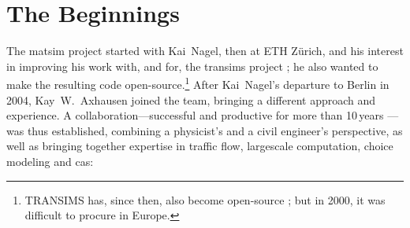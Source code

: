 \section{The Beginnings}
\label{sec:howitstarted}
The \gls{matsim} project \citep[][]{MATSIM_Webpage_2015} started with Kai~Nagel, then at ETH Zürich, and his interest in improving his work with, and for, the \gls{transims} project \citep[][]{SmithEtc1995TRANSIMSSeattle,TRANSIMSFHWA_Webpage_2013}; he also wanted to make the resulting code open-source.\footnote{%
%
TRANSIMS has, since then, also become open-source \citep{TRANSIMSOS_Webpage_2013}; but in 2000, it was difficult to procure in Europe.
%
} After Kai~Nagel's departure to Berlin in 2004, Kay~W.~Axhausen joined the team, bringing a different approach and experience. A collaboration---successful and productive for more than 10\,years ---was thus established, combining a physicist's and a civil engineer's perspective, as well as  bringing together expertise in
%
traffic flow,
%
\gls{largescale} computation,
%
choice modeling
%
and
%
\gls{cas}:
%
%
%
%
%
%
%
